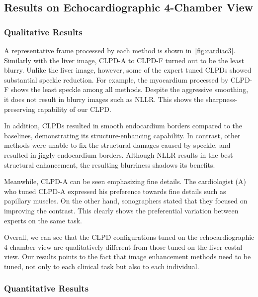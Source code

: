 \subsection{Results on Echocardiographic 4-Chamber View}

\subsubsection{Qualitative Results}
A representative frame processed by each method is shown in~\cref{fig:cardiac3}.
Similarly with the liver image, CLPD-A to CLPD-F turned out to be the least blurry.
Unlike the liver image, however, some of the expert tuned CLPDs showed substantial speckle reduction.
For example, the myocardium processed by CLPD-F shows the least speckle among all methods.
Despite the aggressive smoothing, it does not result in blurry images such as NLLR.
This shows the sharpness-preserving capability of our CLPD.

In addition, CLPDs resulted in smooth endocardium borders compared to the baselines, demonstrating its structure-enhancing capability.
In contrast, other methods were unable to fix the structural damages caused by speckle, and resulted in jiggly endocardium borders.
Although NLLR results in the best structural enhancement, the resulting blurriness shadows its benefits.

Meanwhile, CLPD-A can be seen emphasizing fine details.
The cardiologist (A) who tuned CLPD-A expressed his preference towards fine details such as papillary muscles.
On the other hand, sonographers stated that they focused on improving the contrast.
This clearly shows the preferential variation between experts on the same task.

Overall, we can see that the CLPD configurations tuned on the echocardiographic 4-chamber view are qualitatively different from those tuned on the liver costal view.
Our results points to the fact that image enhancement methods need to be tuned, not only to each clinical task but also to each individual.

\subsubsection{Quantitative Results}

